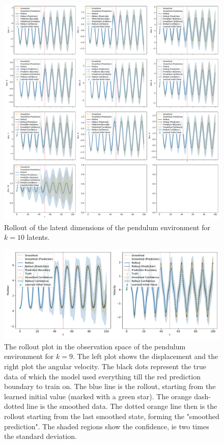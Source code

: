 		\begin{figure}
			\centering
			\includegraphics[width=\linewidth]{figures/results/pendulum/run-latent-dim-10/rollout-latents-N0.pdf}
			\caption{Rollout of the latent dimensions of the pendulum environment for \(k = 10 \) latents.}
			\label{fig:pendulumLatentRolloutL10}
		\end{figure}
		\begin{figure}
			\centering
			\includegraphics[width=\linewidth]{figures/results/pendulum/run-latent-dim-09/rollout-observations-N0.pdf}
			\caption{The rollout plot in the observation space of the pendulum environment for \(k = 9\). The left plot shows the displacement and the right plot the angular velocity. The black dots represent the true data of which the model used everything till the red prediction boundary to train on. The blue line is the rollout, starting from the learned initial value (marked with a green star). The orange dash-dotted line is the smoothed data. The dotted orange line then is the rollout starting from the last smoothed state, forming the "smoothed prediction". The shaded regions show the confidence, \ac{ie} two times the standard deviation.}
			\label{fig:pendulumRolloutL09}
		\end{figure}

